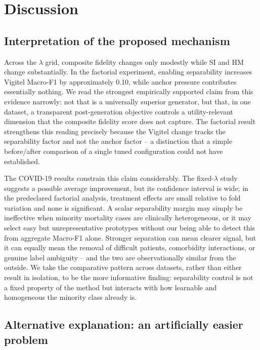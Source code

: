 \section{Discussion}
\label{sec:discussion}

\subsection{Interpretation of the proposed mechanism}
\label{sec:mechanism}

Across the \sepa{} $\lambda$ grid, composite fidelity changes only modestly while SI and HM change substantially. In the factorial experiment, enabling separability increases Vigitel Macro-F1 by approximately 0.10, while anchor pressure contributes essentially nothing. We read the strongest empirically supported claim from this evidence narrowly: not that \sepa{} is a universally superior generator, but that, in one dataset, a transparent post-generation objective controls a utility-relevant dimension that the composite fidelity score does not capture. The factorial result strengthens this reading precisely because the Vigitel change tracks the separability factor and not the anchor factor -- a distinction that a simple before/after comparison of a single tuned configuration could not have established.

The COVID-19 results constrain this claim considerably. The fixed-$\lambda$ study suggests a possible average improvement, but its confidence interval is wide; in the predeclared factorial analysis, treatment effects are small relative to fold variation and none is significant. A scalar separability margin may simply be ineffective when minority mortality cases are clinically heterogeneous, or it may select easy but unrepresentative prototypes without our being able to detect this from aggregate Macro-F1 alone. Stronger separation can mean clearer signal, but it can equally mean the removal of difficult patients, comorbidity interactions, or genuine label ambiguity -- and the two are observationally similar from the outside. We take the comparative pattern across datasets, rather than either result in isolation, to be the more informative finding: separability control is not a fixed property of the method but interacts with how learnable and homogeneous the minority class already is.

\subsection{Alternative explanation: an artificially easier problem}
\label{sec:alternative}

